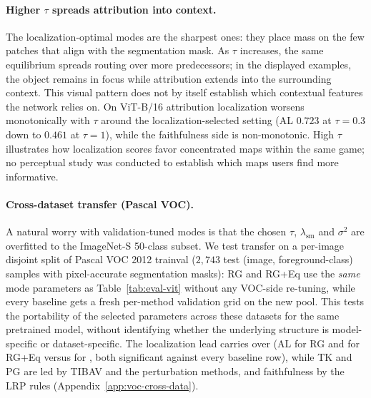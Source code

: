 \documentclass[twoside]{article}
\newcommand{\1}{\mathbf{1}}
\begin{document}
\paragraph{Higher $\tau$ spreads attribution into context.}
The localization-optimal modes are the sharpest ones: they place mass on the few patches that align
with the segmentation mask. As $\tau$ increases, the same equilibrium spreads routing over more
predecessors; in the displayed examples, the object remains in focus while attribution extends
into the surrounding context. This visual pattern does not by itself establish which contextual
features the network relies on. On ViT-B/16 attribution
localization worsens monotonically with $\tau$ around the localization-selected setting (AL $0.723$
at $\tau{=}0.3$ down to $0.461$ at $\tau{=}1$), while the faithfulness side is non-monotonic. High
$\tau$ illustrates how localization scores favor concentrated maps within the same game; no
perceptual study was conducted to establish which maps users find more informative.

\paragraph{Cross-dataset transfer (Pascal VOC).}
A natural worry with validation-tuned modes is that the chosen $\tau$, $\lambda_{\mathrm{sm}}$ and
$\sigma^2$ are overfitted to the ImageNet-S 50-class subset. We test transfer on a per-image
disjoint split of Pascal VOC 2012 trainval ($2{,}743$ test (image, foreground-class) samples with
pixel-accurate segmentation masks): \ac{RG} and \ac{RG}+Eq use the \emph{same} mode parameters as
Table~\ref{tab:eval-vit} without any VOC-side re-tuning, while every baseline gets a fresh
per-method validation grid on the new pool. This tests the portability of the selected parameters
across these datasets for the same pretrained model, without identifying whether the underlying
structure is model-specific or dataset-specific. The localization lead carries over (AL
\vocRGlocAL{} for \ac{RG} and \vocRGEqlocAL{} for \ac{RG}+Eq versus \vocBestBaseAL{} for
\vocBestBaseALname{}, both significant against every baseline row), while TK and PG are led by
\ac{TIBAV} and the perturbation methods, and faithfulness by the \ac{LRP} rules
(Appendix~\ref{app:voc-cross-data}).
\end{document}
